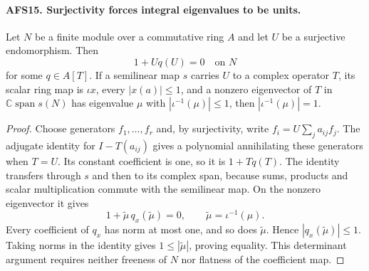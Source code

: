 \paragraph{AFS15. Surjectivity forces integral eigenvalues to be units.}
\label{claim:AFS15}
Let $N$ be a finite module over a commutative ring $A$ and
let $U$ be a surjective endomorphism.  Then
\[
                  1+Uq(U)=0\quad\text{on }N
\]
for some $q\in A[T]$.  If a semilinear map $s$ carries $U$
to a complex operator $T$, its scalar ring map is
$\iota x$, every $|x(a)|\leq1$, and a nonzero eigenvector
of $T$ in $\mathbb C\operatorname{span}s(N)$ has eigenvalue
$\mu$ with $|\iota^{-1}(\mu)|\leq1$, then
$|\iota^{-1}(\mu)|=1$.
\begin{proof}
Choose generators $f_1,\ldots,f_r$ and, by surjectivity,
write $f_i=U\sum_ja_{ij}f_j$.  The adjugate identity for
$I-T(a_{ij})$ gives a polynomial annihilating these
generators when $T=U$.  Its constant coefficient is one,
so it is $1+Tq(T)$.  The identity transfers through $s$
and then to its complex span, because sums, products and
scalar multiplication commute with the semilinear map.
On the nonzero eigenvector it gives
\[
  1+\widetilde\mu\,q_x(\widetilde\mu)=0,
              \qquad\widetilde\mu=\iota^{-1}(\mu).
\]
Every coefficient of $q_x$ has norm at most one, and so
does $\widetilde\mu$.  Hence $|q_x(\widetilde\mu)|\leq1$.
Taking norms in the identity gives
$1\leq|\widetilde\mu|$, proving equality.  This determinant
argument requires neither freeness of $N$ nor flatness
of the coefficient map.
\end{proof}

